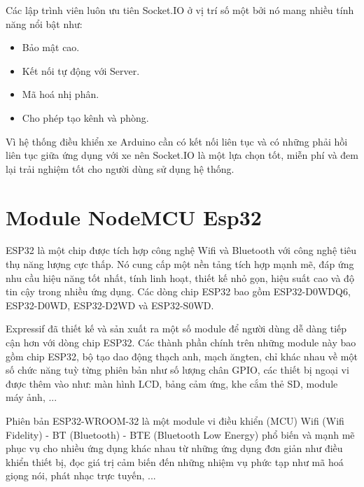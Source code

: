 \documentclass[../DoAn.tex]{subfiles}
\begin{document}
Các lập trình viên luôn ưu tiên Socket.IO ở vị trí số một bởi nó mang nhiều tính năng nổi bật như:
\begin{itemize}
    \item Bảo mật cao.
    \item Kết nối tự động với Server.
    \item Mã hoá nhị phân.
    \item Cho phép tạo kênh và phòng.
\end{itemize}

Vì hệ thống điều khiển xe Arduino cần có kết nối liên tục và có những phải hồi liên tục giữa ứng dụng với xe nên Socket.IO là một lựa chọn tốt, miễn phí và đem lại trải nghiệm tốt cho người dùng sử dụng hệ thống.

\section{Module NodeMCU Esp32}
\label{section:3.5}

ESP32 là một chip được tích hợp công nghệ Wifi và Bluetooth\cite{Bluetooth} với công nghệ tiêu thụ năng lượng cực thấp. Nó cung cấp một nền tảng tích hợp mạnh mẽ, đáp ứng nhu cầu hiệu năng tốt nhất, tính linh hoạt, thiết kế nhỏ gọn, hiệu suất cao và độ tin cậy trong nhiều ứng dụng. Các dòng chip ESP32 bao gồm ESP32-D0WDQ6, ESP32-D0WD, ESP32-D2WD và ESP32-S0WD.

Expressif đã thiết kế và sản xuất ra một số module để người dùng dễ dàng tiếp cận hơn với dòng chip ESP32. Các thành phần chính trên những module này bao gồm chip ESP32, bộ tạo dao động thạch anh, mạch ăngten, chỉ khác nhau về một số chức năng tuỳ từng phiên bản như số lượng chân GPIO, các thiết bị ngoại vi được thêm vào như: màn hình LCD, bảng cảm ứng, khe cắm thẻ SD, module máy ảnh, ... 

Phiên bản ESP32-WROOM-32 là một module vi điều khiển (MCU) Wifi (Wifi Fidelity) - BT (Bluetooth) - BTE (Bluetooth Low Energy) phổ biến và mạnh mẽ phục vụ cho nhiều ứng dụng khác nhau từ những ứng dụng đơn giản như điều khiển thiết bị, đọc giá trị cảm biến đến những nhiệm vụ phức tạp như mã hoá giọng nói, phát nhạc trực tuyến, ...
\end{document}

